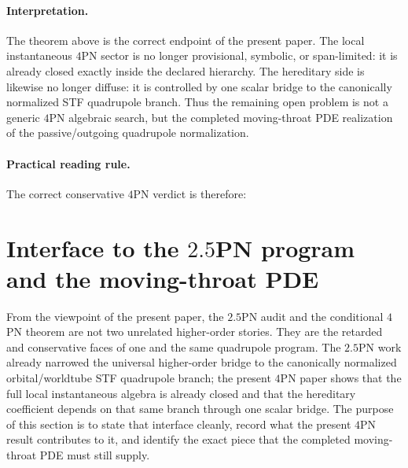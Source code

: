 \documentclass[11pt]{article}
\begin{document}
\paragraph{Interpretation.}
The theorem above is the correct endpoint of the present paper.  The local
instantaneous $4$PN sector is no longer provisional, symbolic, or span-limited:
it is already closed exactly inside the declared hierarchy.  The hereditary side
is likewise no longer diffuse: it is controlled by one scalar bridge to the
canonically normalized STF quadrupole branch.  Thus the remaining open problem
is not a generic $4$PN algebraic search, but the completed moving-throat PDE
realization of the passive/outgoing quadrupole normalization.

\paragraph{Practical reading rule.}
The correct conservative $4$PN verdict is therefore:
\begin{center}
\end{center}


\section{Interface to the \texorpdfstring{$2.5$}{2.5}PN program and the moving-throat PDE}
\label{sec:interface-25pn-pde}

From the viewpoint of the present paper, the $2.5$PN audit and the conditional
$4$PN theorem are not two unrelated higher-order stories.  They are the
retarded and conservative faces of one and the same quadrupole program.  The
$2.5$PN work already narrowed the universal higher-order bridge to the
canonically normalized orbital/worldtube STF quadrupole branch; the present
$4$PN paper shows that the full local instantaneous algebra is already closed
and that the hereditary coefficient depends on that same branch through one
scalar bridge.  The purpose of this section is to state that interface cleanly,
record what the present $4$PN result contributes to it, and identify the exact
piece that the completed moving-throat PDE must still supply.
\end{document}
